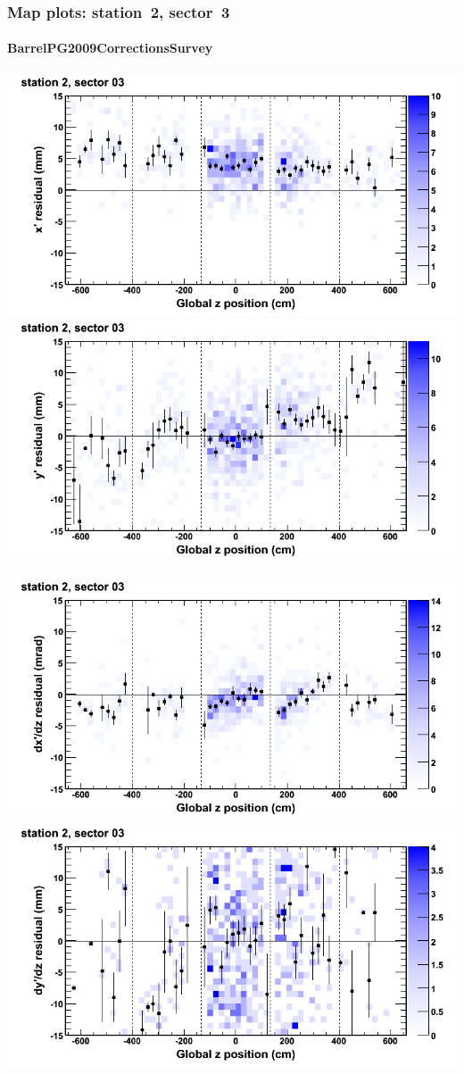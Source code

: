 \documentclass[compress]{beamer}
\begin{document}
\begin{frame}
\frametitle{Map plots: station~2, sector~3}
\framesubtitle{BarrelPG2009CorrectionsSurvey}
\includegraphics[width=0.5\linewidth]{mapplots_01/DTvsz_st2sec03_x.png}
\includegraphics[width=0.5\linewidth]{mapplots_01/DTvsz_st2sec03_y.png}

\includegraphics[width=0.5\linewidth]{mapplots_01/DTvsz_st2sec03_dxdz.png}
\includegraphics[width=0.5\linewidth]{mapplots_01/DTvsz_st2sec03_dydz.png}
\end{frame}
\end{document}
